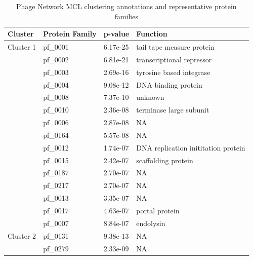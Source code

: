 \begin{table}
    \caption{Phage Network MCL clustering annotations and representative protein families}
    \tiny

    \begin{lrbox}{\leftbox}
            \begin{tabular}[t]{llll}
            \toprule
            Cluster & Protein Family & p-value & Function \\
            \midrule
            \multirow{1}{*}{Cluster 1} & pf\_0001 & 6.17e-25 & tail tape measure protein \\ 
                                        & pf\_0002 & 6.81e-21 & transcriptional repressor \\ 
                                        & pf\_0003 & 2.69e-16 & tyrosine based integrase \\ 
                                        & pf\_0004 & 9.08e-12 & DNA binding protein \\ 
                                        & pf\_0008 & 7.37e-10 & unknown \\ 
                                        & pf\_0010 & 2.36e-08 & terminase large subunit \\ 
                                        & pf\_0006 & 2.87e-08 & NA \\ 
                                        & pf\_0164 & 5.57e-08 & NA \\ 
                                        & pf\_0012 & 1.74e-07 & DNA replication inititation protein \\ 
                                        & pf\_0015 & 2.42e-07 & scaffolding protein \\ 
                                        & pf\_0187 & 2.70e-07 & NA \\ 
                                        & pf\_0217 & 2.70e-07 & NA \\ 
                                        & pf\_0013 & 3.35e-07 & NA \\ 
                                        & pf\_0017 & 4.63e-07 & portal protein \\ 
                                        & pf\_0007 & 8.84e-07 & endolysin \\ 
            \midrule
            \multirow{1}{*}{Cluster 2} & pf\_0131 & 9.38e-13 & NA \\ 
                                        & pf\_0279 & 2.33e-09 & NA \\ 

\end{tabular}
\end{lrbox}
\end{table}
